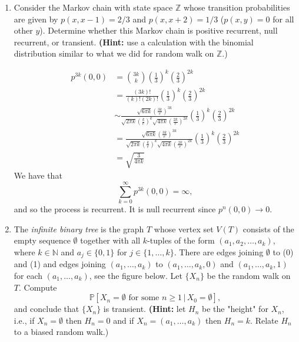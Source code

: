 \documentclass[10pt, oneside]{article}
\theoremstyle{definition}
\begin{document}
\begin{enumerate}
\item
Consider the Markov chain with state space \(\mathbb{Z}\) whose transition probabilities are given by \(p(x,x-1)=2/3\) and \(p(x,x+2)=1/3\) (\(p(x,y)=0\) for all other \(y\)). Determine whether this Markov chain is positive recurrent, null recurrent, or transient. \textbf{(Hint:} use a calculation with the binomial distribution similar to what we did for random walk on \(\mathbb{Z}\).)
\begin{solution}
\begin{align*}
p^{3k}(0,0) &= \binom{3k}{k}(\frac{1}{3})^k(\frac{2}{3})^{2k}\\  &= \frac{(3k)!}{(k)! (2k)!}(\frac{1}{3})^k(\frac{2}{3})^{2k}     \\
&\sim \frac{\sqrt{6\pi k} (\frac{3k}{e})^{3k}}{\sqrt{2\pi k}(\frac{k}{e})^k \sqrt{4\pi k}(\frac{2k}{e})^{2k}}(\frac{1}{3})^k(\frac{2}{3})^{2k} \\
&= \frac{\sqrt{6\pi k} (\frac{3k}{e})^{3k}}{\sqrt{2\pi k}(\frac{k}{e})^k \sqrt{4\pi k}(\frac{2k}{e})^{2k}}(\frac{1}{3})^k(\frac{2}{3})^{2k}\\
&= \sqrt{\frac{3}{4\pi k}}
\end{align*}
We have that 
\[\sum_{k=0}^\infty p^{3k}(0,0)  = \infty,\] and so the process is recurrent. It is null recurrent since $p^n(0,0) \to 0.$

\end{solution}

\item
The \emph{infinite binary tree} is the graph \(T\) whose vertex set \(V(T)\) consists of the empty sequence \(\emptyset\) together with all \(k\)-tuples of the form \((a_1,a_2,\ldots,a_k)\), where \(k\in\mathbb{N}\) and \(a_j\in\{0,1\}\) for \(j\in\{1,\ldots,k\}\). There are edges joining \(\emptyset\) to (0) and (1) and edges joining \((a_1,\ldots,a_k)\) to \((a_1,\ldots,a_k,0)\) and \((a_1,\ldots,a_k,1)\) for each \((a_1,\ldots,a_k)\), see the figure below. Let \(\{X_n\}\) be the random walk on \(T\). Compute
\[
\mathbb{P}[X_n=\emptyset\text{ for some }n\geq 1\,|\,X_0=\emptyset],
\]
and conclude that \(\{X_n\}\) is transient. \textbf{(Hint:} let \(H_n\) be the "height" for \(X_n\), i.e., if \(X_n=\emptyset\) then \(H_n=0\) and if \(X_n=(a_1,\ldots,a_k)\) then \(H_n=k\). Relate \(H_n\) to a biased random walk.)

\end{enumerate}
\end{document}
